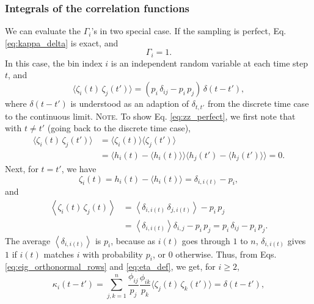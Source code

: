 \documentclass[reprint]{revtex4-1}
\newcommand{\note}[1]{{\color{DarkGreen}\footnotesize \textsc{Note.} #1}}
\begin{document}
\subsubsection{Integrals of the correlation functions}



We can evaluate the $\Gamma_i$'s
in two special case.
%
If the sampling is perfect,
Eq. \eqref{eq:kappa_delta} is exact, and
%
\begin{equation}
  \Gamma_i = 1.
  \label{eq:Gamma_perfect}
\end{equation}
%
In this case,
the bin index $i$ is an independent random variable
at each time step $t$, and
%
\begin{equation}
  \langle \zeta_i(t) \, \zeta_j(t') \rangle
  =
  \left( p_i \, \delta_{ij} - p_i \, p_j \right) \, \delta(t - t'),
  \label{eq:zz_perfect}
\end{equation}
%
where $\delta(t - t')$ is understood as an adaption of $\delta_{t, t'}$
from the discrete time case to the continuous limit. %
%
\note{To show Eq. \eqref{eq:zz_perfect}, we first note that
  with $t \ne t'$ (going back to the discrete time case),
  $$
  \begin{aligned}
  \langle \zeta_i(t) \, \zeta_j(t') \rangle
  &=
  \langle \zeta_i(t)  \rangle
  \langle \zeta_j(t') \rangle
  \\
  &=
  \bigl\langle h_i(t)  - \langle h_i(t)  \rangle \bigr\rangle
  \bigl\langle h_j(t') - \langle h_j(t') \rangle \bigr\rangle
  =
  0.
  \end{aligned}
  $$
  Next, for $t = t'$, we have
  $$
  \zeta_i(t)
  = h_i(t) - \langle h_i(t) \rangle
  = \delta_{i, i(t)} - p_i,
  $$
  and
  $$
  \begin{aligned}
  \left\langle
    \zeta_i(t) \, \zeta_j(t)
  \right\rangle
  &=
  \left\langle
    \delta_{i, i(t)} \, \delta_{j, i(t)}
  \right\rangle
  -
  p_i \, p_j
  \\
  &=
  \left\langle
    \delta_{i, i(t)}
  \right\rangle
  \delta_{i, j}
  -
  p_i \, p_j
  =
  p_i \, \delta_{ij}
  - p_i \, p_j.
  \end{aligned}
  $$
  The average
  $\left\langle \delta_{i, i(t)} \right\rangle$ is $p_i$,
  because as $i(t)$ goes through $1$ to $n$,
  $\delta_{i, i(t)}$ gives $1$
  if $i(t)$ matches $i$ with probability $p_i$,
  or $0$ otherwise.
}
%
Thus, from Eqs. \eqref{eq:eig_orthonormal_rows} and \eqref{eq:eta_def},
we get, for $i \ge 2$,
%
\begin{equation}
  \kappa_i(t - t')
  =
  \sum_{j,k = 1}^n
  \frac{ \phi_{ij} } { p_j }
  \frac{ \phi_{ik} } { p_k }
  \langle \zeta_j(t) \, \zeta_k(t') \rangle
  = \delta(t - t'),
  \label{eq:kappa_perfect}
\end{equation}
\end{document}
